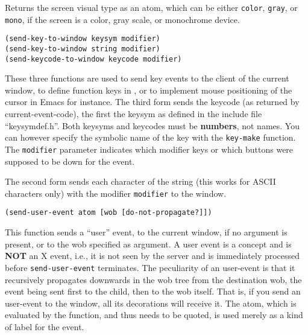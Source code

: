 

Returns the screen visual type as an atom, which can be either \verb"color",
\verb"gray", or \verb"mono", if the screen is a color, gray scale, or
monochrome device.

        
{\usagefont\begin{verbatim}
(send-key-to-window keysym modifier)
(send-key-to-window string modifier)
(send-keycode-to-window keycode modifier)
\end{verbatim}}\usageupspace

These three functions are used to send key events to the client of the
current window, to define function keys in {\GWM}, or to implement mouse
positioning of the cursor in Emacs for instance. The third form sends the
keycode (as returned by current-event-code), the first the keysym as defined in
the include file ``keysymdef.h''. Both keysyms and keycodes must be {\bf
numbers}, not names. You can however specify the symbolic name of the key
with the \verb"key-make" function. The \verb"modifier" parameter indicates 
which
modifier keys or which buttons were supposed to be down for the event.

The second form sends each character of the string (this works for
ASCII characters only) with the modifier \verb"modifier" to the window.

        
{\usagefont\begin{verbatim}
(send-user-event atom [wob [do-not-propagate?]])
\end{verbatim}}\usageupspace

This function sends a ``user'' event, to the current window, if no argument
is present, or to the wob specified as argument. A user event is a {\GWM}
concept and is {\bf NOT} an X event, i.e., it is not seen by the server and is
immediately processed before \verb"send-user-event" terminates. The
peculiarity of an user-event is that it recursively propagates downwards in
the wob tree from the destination wob, the event being sent first to the
child, then to the wob itself. That is, if you send an user-event to the window, all
its decorations will receive it. The atom, which is evaluated by the
function, and thus needs to be quoted, is used merely as a kind of label for
the event.

